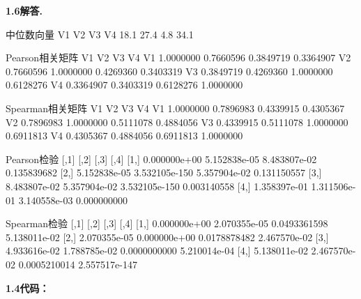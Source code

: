 \documentclass[12pt, a4paper, oneside]{ctexart}
\newenvironment{solution}[1][]{\par\noindent\textbf{#1解答. }}{\smallskip\par}  %
\begin{document}
\begin{solution}[1.6]
\begin{cppcode}
中位数向量
  V1   V2   V3   V4
18.1 27.4  4.8 34.1

Pearson相关矩阵
          V1        V2        V3        V4
V1 1.0000000 0.7660596 0.3849719 0.3364907
V2 0.7660596 1.0000000 0.4269360 0.3403319
V3 0.3849719 0.4269360 1.0000000 0.6128276
V4 0.3364907 0.3403319 0.6128276 1.0000000

Spearman相关矩阵
          V1        V2        V3        V4
V1 1.0000000 0.7896983 0.4339915 0.4305367
V2 0.7896983 1.0000000 0.5111078 0.4884056
V3 0.4339915 0.5111078 1.0000000 0.6911813
V4 0.4305367 0.4884056 0.6911813 1.0000000

Pearson检验
             [,1]          [,2]          [,3]        [,4]
[1,] 0.000000e+00  5.152838e-05  8.483807e-02 0.135839682
[2,] 5.152838e-05 3.532105e-150  5.357904e-02 0.131150557
[3,] 8.483807e-02  5.357904e-02 3.532105e-150 0.003140558
[4,] 1.358397e-01  1.311506e-01  3.140558e-03 0.000000000

Spearman检验
             [,1]         [,2]         [,3]          [,4]
[1,] 0.000000e+00 2.070355e-05 0.0493361598  5.138011e-02
[2,] 2.070355e-05 0.000000e+00 0.0178878482  2.467570e-02
[3,] 4.933616e-02 1.788785e-02 0.0000000000  5.210014e-04
[4,] 5.138011e-02 2.467570e-02 0.0005210014 2.557517e-147
\end{cppcode}
\end{solution}
\clearpage
\textbf{1.4代码：}
\end{document}
